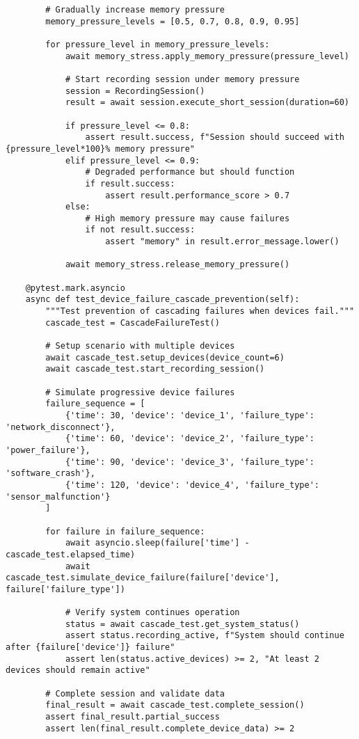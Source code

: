 \documentclass[12pt,a4paper]{article}
\begin{document}
\begin{verbatim}
        # Gradually increase memory pressure
        memory_pressure_levels = [0.5, 0.7, 0.8, 0.9, 0.95]
        
        for pressure_level in memory_pressure_levels:
            await memory_stress.apply_memory_pressure(pressure_level)
            
            # Start recording session under memory pressure
            session = RecordingSession()
            result = await session.execute_short_session(duration=60)
            
            if pressure_level <= 0.8:
                assert result.success, f"Session should succeed with {pressure_level*100}% memory pressure"
            elif pressure_level <= 0.9:
                # Degraded performance but should function
                if result.success:
                    assert result.performance_score > 0.7
            else:
                # High memory pressure may cause failures
                if not result.success:
                    assert "memory" in result.error_message.lower()
            
            await memory_stress.release_memory_pressure()
    
    @pytest.mark.asyncio
    async def test_device_failure_cascade_prevention(self):
        """Test prevention of cascading failures when devices fail."""
        cascade_test = CascadeFailureTest()
        
        # Setup scenario with multiple devices
        await cascade_test.setup_devices(device_count=6)
        await cascade_test.start_recording_session()
        
        # Simulate progressive device failures
        failure_sequence = [
            {'time': 30, 'device': 'device_1', 'failure_type': 'network_disconnect'},
            {'time': 60, 'device': 'device_2', 'failure_type': 'power_failure'},
            {'time': 90, 'device': 'device_3', 'failure_type': 'software_crash'},
            {'time': 120, 'device': 'device_4', 'failure_type': 'sensor_malfunction'}
        ]
        
        for failure in failure_sequence:
            await asyncio.sleep(failure['time'] - cascade_test.elapsed_time)
            await cascade_test.simulate_device_failure(failure['device'], failure['failure_type'])
            
            # Verify system continues operation
            status = await cascade_test.get_system_status()
            assert status.recording_active, f"System should continue after {failure['device']} failure"
            assert len(status.active_devices) >= 2, "At least 2 devices should remain active"
        
        # Complete session and validate data
        final_result = await cascade_test.complete_session()
        assert final_result.partial_success
        assert len(final_result.complete_device_data) >= 2
\end{verbatim}
\end{document}
